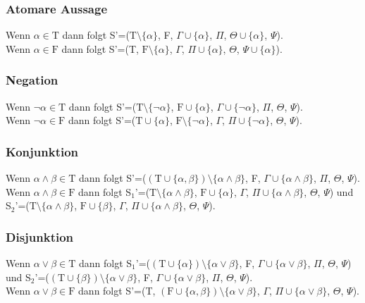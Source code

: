 \subsubsection{Atomare Aussage}
Wenn $\alpha\in\textrm{T}$ dann folgt S'=($\textrm{T}\setminus\lbrace\alpha\rbrace$, F, $\Gamma\cup\lbrace\alpha\rbrace$, $\Pi$, $\Theta\cup\lbrace\alpha\rbrace$, $\Psi$).\\
Wenn $\alpha\in\textrm{F}$ dann folgt S'=(T, $\textrm{F}\setminus\lbrace\alpha\rbrace$, $\Gamma$, $\Pi\cup\lbrace\alpha\rbrace$, $\Theta$, $\Psi\cup\lbrace\alpha\rbrace$).

\subsubsection{Negation}
Wenn $\neg\alpha\in\textrm{T}$ dann folgt S'=($\textrm{T}\setminus\lbrace\neg\alpha\rbrace$, $\textrm{F}\cup\lbrace\alpha\rbrace$, $\Gamma\cup\lbrace\neg\alpha\rbrace$, $\Pi$, $\Theta$, $\Psi$).\\
Wenn $\neg\alpha\in\textrm{F}$ dann folgt S'=($\textrm{T}\cup\lbrace\alpha\rbrace$, $\textrm{F}\setminus\lbrace\neg\alpha\rbrace$, $\Gamma$, $\Pi\cup\lbrace\neg\alpha\rbrace$, $\Theta$, $\Psi$).

\subsubsection{Konjunktion}
Wenn $\alpha\wedge\beta\in\textrm{T}$ dann folgt S'=($(\textrm{T}\cup\lbrace\alpha,\beta\rbrace)\setminus\lbrace\alpha\wedge\beta\rbrace$, F, $\Gamma\cup\lbrace\alpha\wedge\beta\rbrace$, $\Pi$, $\Theta$, $\Psi$).\\
Wenn $\alpha\wedge\beta\in\textrm{F}$ dann folgt S$_{1}$'=($\textrm{T}\setminus\lbrace\alpha\wedge\beta\rbrace$, $\textrm{F}\cup\lbrace\alpha\rbrace$, $\Gamma$, $\Pi\cup\lbrace\alpha\wedge\beta\rbrace$, $\Theta$, $\Psi$) und S$_{2}$'=($\textrm{T}\setminus\lbrace\alpha\wedge\beta\rbrace$, $\textrm{F}\cup\lbrace\beta\rbrace$, $\Gamma$, $\Pi\cup\lbrace\alpha\wedge\beta\rbrace$, $\Theta$, $\Psi$).

\subsubsection{Disjunktion}
Wenn $\alpha\vee\beta\in\textrm{T}$ dann folgt S$_{1}$'=($(\textrm{T}\cup\lbrace\alpha\rbrace)\setminus\lbrace\alpha\vee\beta\rbrace$, F, $\Gamma\cup\lbrace\alpha\vee\beta\rbrace$, $\Pi$, $\Theta$, $\Psi$) und S$_{2}$'=($(\textrm{T}\cup\lbrace\beta\rbrace)\setminus\lbrace\alpha\vee\beta\rbrace$, F, $\Gamma\cup\lbrace\alpha\vee\beta\rbrace$, $\Pi$, $\Theta$, $\Psi$).\\
Wenn $\alpha\vee\beta\in\textrm{F}$ dann folgt S'=(T, $(\textrm{F}\cup\lbrace\alpha,\beta\rbrace)\setminus\lbrace\alpha\vee\beta\rbrace$, $\Gamma$, $\Pi\cup\lbrace\alpha\vee\beta\rbrace$, $\Theta$, $\Psi$).

